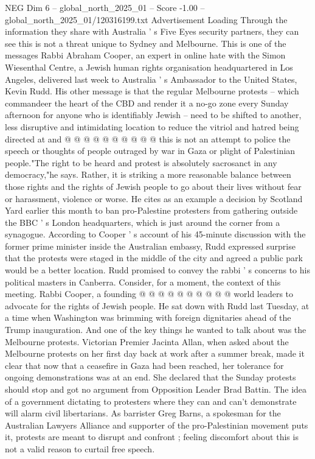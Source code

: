 \begin{textsample}{NEG Dim 6 – global\_north\_2025\_01 – Score -1.00 – global\_north\_2025\_01/120316199.txt}
Advertisement Loading Through the information they share with Australia ' s Five Eyes security partners, they can see this is not a threat unique to Sydney and Melbourne.
This is one of the messages Rabbi Abraham Cooper, an expert in online hate with the Simon Wiesenthal Centre, a Jewish human rights organisation headquartered in Los Angeles, delivered last week to Australia ' s Ambassador to the United States, Kevin Rudd.
His other message is that the regular Melbourne protests -- which commandeer the heart of the CBD and render it a no-go zone every Sunday afternoon for anyone who is identifiably Jewish -- need to be shifted to another, less disruptive and intimidating location to reduce the vitriol and hatred being directed at and @ @ @ @ @ @ @ @ @ @ this is not an attempt to police the speech or thoughts of people outraged by war in Gaza or plight of Palestinian people."The right to be heard and protest is absolutely sacrosanct in any democracy,"he says.
Rather, it is striking a more reasonable balance between those rights and the rights of Jewish people to go about their lives without fear or harassment, violence or worse.
He cites as an example a decision by Scotland Yard earlier this month to ban pro-Palestine protesters from gathering outside the BBC ' s London headquarters, which is just around the corner from a synagogue.
According to Cooper ' s account of his 45-minute discussion with the former prime minister inside the Australian embassy, Rudd expressed surprise that the protests were staged in the middle of the city and agreed a public park would be a better location.
Rudd promised to convey the rabbi ' s concerns to his political masters in Canberra.
Consider, for a moment, the context of this meeting.
Rabbi Cooper, a founding @ @ @ @ @ @ @ @ @ @ world leaders to advocate for the rights of Jewish people.
He sat down with Rudd last Tuesday, at a time when Washington was brimming with foreign dignitaries ahead of the Trump inauguration.
And one of the key things he wanted to talk about was the Melbourne protests.
Victorian Premier Jacinta Allan, when asked about the Melbourne protests on her first day back at work after a summer break, made it clear that now that a ceasefire in Gaza had been reached, her tolerance for ongoing demonstrations was at an end.
She declared that the Sunday protests should stop and got no argument from Opposition Leader Brad Battin.
The idea of a government dictating to protesters where they can and can't demonstrate will alarm civil libertarians.
As barrister Greg Barns, a spokesman for the Australian Lawyers Alliance and supporter of the pro-Palestinian movement puts it, protests are meant to disrupt and confront ; feeling discomfort about this is not a valid reason to curtail free speech.

\end{textsample}

